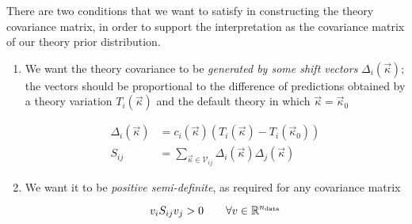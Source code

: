There are two conditions that we want to satisfy in constructing the theory
covariance matrix, in order to support the interpretation as the covariance
matrix of our theory prior distribution.

\begin{enumerate}[label=\Alph*.]
    \item We want the theory covariance to be \textit{generated by some shift
        vectors} $\Delta_i(\vec{\kappa})$; the vectors should be proportional
        to the difference of predictions obtained by a theory variation
        $T_i(\vec{\kappa})$ and the default theory in which $\vec{\kappa} =
        \vec{\kappa}_0$

        \begin{align}
            \Delta_i(\vec{\kappa}) &= c_i(\vec{\kappa}) \left(T_i(\vec{\kappa}) - T_i(\vec{\kappa}_0)\right)
            \label{eq:mhou/prescr/shifts}\\
            S_{ij} &= \sum_{\vec{\kappa} \in \mathcal{V}_{ij}} \Delta_i(\vec{\kappa})\Delta_j(\vec{\kappa})
            \label{eq:mhou/prescr/thcovmat}
        \end{align}
    \item We want it to be \textit{positive semi-definite}, as required for any
        covariance matrix

        \begin{equation}
            \label{eq:mhou/prescr/pos}
            v_i S_{ij} v_j > 0 \qquad \forall v \in \mathbb{R}^{n_{\text{data}}} 
        \end{equation}
\end{enumerate}
